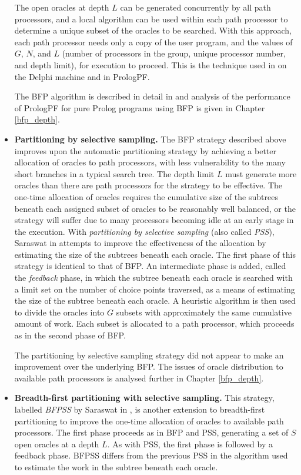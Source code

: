 \begin{itemize}
{  The open oracles at depth $L$ can be generated concurrently by all path processors,
  and a local algorithm can be used within each path processor to determine a unique subset
  of the oracles to be searched.  With this approach, each path processor needs only a
  copy of the user program, and the values of $G$, $N$, and $L$ (number of processors in
  the group, unique processor number, and depth limit), for execution to proceed.  This
  is the technique used in \cite{Sar95} on the Delphi machine and in PrologPF.

  The BFP algorithm is described in detail in \cite{Sar95} and analysis of the
  performance of PrologPF for pure Prolog programs using BFP is given in Chapter
  \ref{bfp_depth}.
  }
\item{\textbf{Partitioning by selective sampling.}
  The BFP strategy described above improves upon the automatic partitioning strategy by
  achieving a better allocation of oracles to path processors, with less vulnerability to
  the many short branches in a typical search tree. The depth limit $L$ must generate
  more oracles than there are path processors for the strategy to be effective.  The
  one-time allocation of oracles requires the cumulative size of the subtrees beneath
  each assigned subset of oracles to be reasonably well balanced, or the strategy will
  suffer due to many processors becoming idle at an early stage in the execution.  With
  \textit{partitioning by
  selective sampling} (also called \textit{PSS}), Saraswat in \cite{Sar95}
  attempts to improve the effectiveness of the allocation by
  estimating the size of the subtrees beneath each oracle.  The first phase of
  this strategy is identical to that of BFP.  An intermediate phase is added, called
  the \textit{feedback} phase, in which the subtree beneath
  each oracle is searched with a limit set on the number of choice points traversed, as
  a means of estimating the size of the subtree beneath each oracle.  A heuristic
  algorithm \cite{Sar95} is then used to divide the oracles into $G$ subsets with
  approximately the same cumulative amount of work.  Each subset is allocated to a
  path processor, which proceeds as in the second phase of BFP.

  The partitioning by selective sampling
  strategy did not appear to make an improvement over the underlying BFP.
  The issues of oracle distribution
  to available path processors is analysed further in Chapter \ref{bfp_depth}.  
  }
\item{\textbf{Breadth-first partitioning with selective sampling.}
  This strategy, labelled \textit{BFPSS} by Saraswat in \cite{Sar95}, is another extension to
  breadth-first partitioning to improve the one-time allocation of oracles to
  available path processors.  The first phase proceeds as in BFP and  PSS, generating
  a set of $S$ open oracles at a depth $L$.  As with PSS, the first phase is followed
  by a feedback phase.  BFPSS differs from the previous PSS in the algorithm used
  to estimate the work in the subtree beneath each oracle.

}
\end{itemize}
